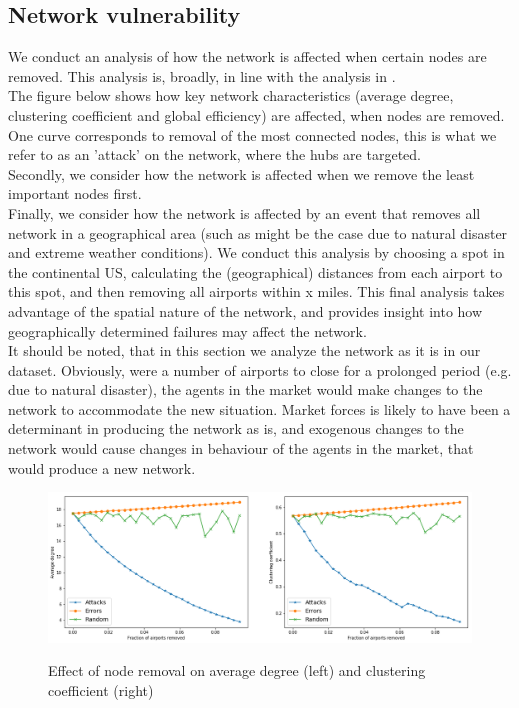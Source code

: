 \subsection{Network vulnerability}
We conduct an analysis of how the network is affected when certain nodes are removed. This analysis is, broadly, in line with the analysis in \cite{chi2004structural}. \\
The figure below shows how key network characteristics (average degree, clustering coefficient and global efficiency) are affected, when nodes are removed. One curve corresponds to removal of the most connected nodes, this is what we refer to as an 'attack' on the network, where the hubs are targeted. \\
Secondly, we consider how the network is affected when we remove the least important nodes first. \\
Finally, we consider how the network is affected by an event that removes all network in a geographical area (such as might be the case due to natural disaster and extreme weather conditions). We conduct this analysis by choosing a spot in the continental US, calculating the (geographical) distances from each airport to this spot, and then removing all airports within x miles. This final analysis takes advantage of the spatial nature of the network, and provides insight into how geographically determined failures may affect the network. \\
It should be noted, that in this section we analyze the network as it is in our dataset. Obviously, were a number of airports to close for a prolonged period (e.g. due to natural disaster), the agents in the market would make changes to the network to accommodate the new situation. Market forces is likely to have been a determinant in producing the network as is, and exogenous changes to the network would cause changes in behaviour of the agents in the market, that would produce a new network. \\ 

\begin{figure}[H]
  \centering
  \caption{Effect of node removal on average degree (left) and clustering coefficient (right)}
    \includegraphics[width=1. \textwidth]{Exam/Figures/attacksanderrors.png}
  \label{fig:attacks_and_errors}
\end{figure}

